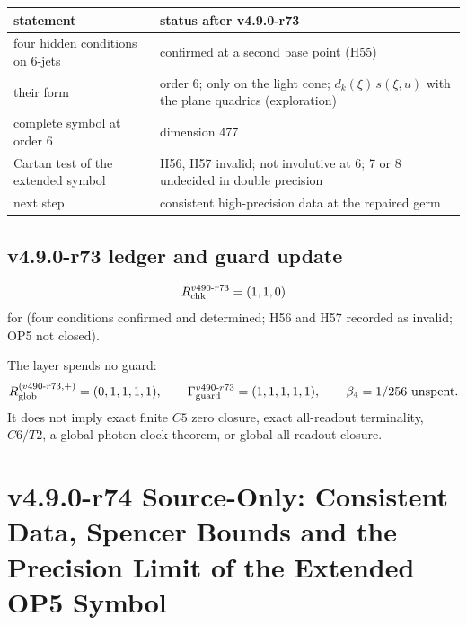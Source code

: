 \begin{center}
\small
\begin{tabular}{@{}>{\raggedright\arraybackslash}p{}>{\raggedright\arraybackslash}p{}@{}}
\toprule
statement & status after v4.9.0-r73\\
\midrule
four hidden conditions on 6-jets & confirmed at a second base point (H55)\\
their form & order 6; only on the light cone; \(d_k(\xi)\,s(\xi,u)\) with the plane quadrics (exploration)\\
complete symbol at order 6 & dimension 477\\
Cartan test of the extended symbol & H56, H57 invalid; not involutive at 6; 7 or 8 undecided in double precision\\
next step & consistent high-precision data at the repaired germ\\
\bottomrule
\end{tabular}
\end{center}

\subsection*{v4.9.0-r73 ledger and guard update}
\label{subsec:v490-r73-ledger-guard}

\[
R_{\rm chk}^{v490\text{-}r73}=(1,1,0)
\]
for (four conditions confirmed and determined; H56 and H57 recorded as invalid; OP5 not closed).

The layer spends no guard:
\[
R_{\rm glob}^{(v490\text{-}r73,+)}=(0,1,1,1,1),
\qquad
\Gamma_{\rm guard}^{v490\text{-}r73}=(1,1,1,1,1),
\qquad
\beta_4=1/256\ \text{unspent}.
\]
It does not imply exact finite \(C5\) zero closure, exact all-readout terminality,
\(C6/T2\), a global photon-clock theorem, or global all-readout closure.

\clearpage
\section*{v4.9.0-r74 Source-Only: Consistent Data, Spencer Bounds and the Precision Limit of the Extended OP5 Symbol}
\label{sec:v490-r74-precision-limit}

